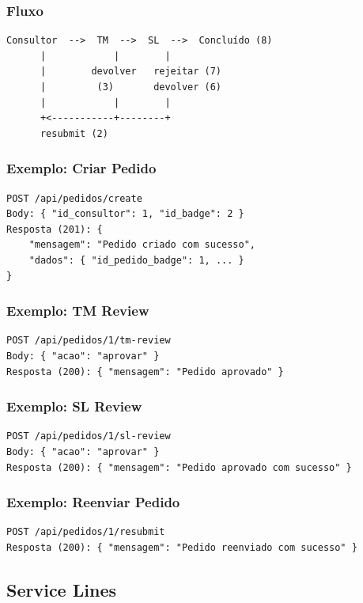 \documentclass[12pt,a4paper]{article}
\begin{document}
\subsubsection*{Fluxo}
\begin{lstlisting}[frame=none]
  Consultor  -->  TM  -->  SL  -->  Concluído (8)
      |            |        |
      |        devolver   rejeitar (7)
      |         (3)       devolver (6)
      |            |        |
      +<-----------+--------+
      resubmit (2)
\end{lstlisting}

\subsubsection*{Exemplo: Criar Pedido}
\begin{lstlisting}
POST /api/pedidos/create
Body: { "id_consultor": 1, "id_badge": 2 }
Resposta (201): {
    "mensagem": "Pedido criado com sucesso",
    "dados": { "id_pedido_badge": 1, ... }
}
\end{lstlisting}

\subsubsection*{Exemplo: TM Review}
\begin{lstlisting}
POST /api/pedidos/1/tm-review
Body: { "acao": "aprovar" }
Resposta (200): { "mensagem": "Pedido aprovado" }
\end{lstlisting}

\subsubsection*{Exemplo: SL Review}
\begin{lstlisting}
POST /api/pedidos/1/sl-review
Body: { "acao": "aprovar" }
Resposta (200): { "mensagem": "Pedido aprovado com sucesso" }
\end{lstlisting}

\subsubsection*{Exemplo: Reenviar Pedido}
\begin{lstlisting}
POST /api/pedidos/1/resubmit
Resposta (200): { "mensagem": "Pedido reenviado com sucesso" }
\end{lstlisting}

\subsection{Service Lines}
\label{sec:servicelines}
\end{document}
